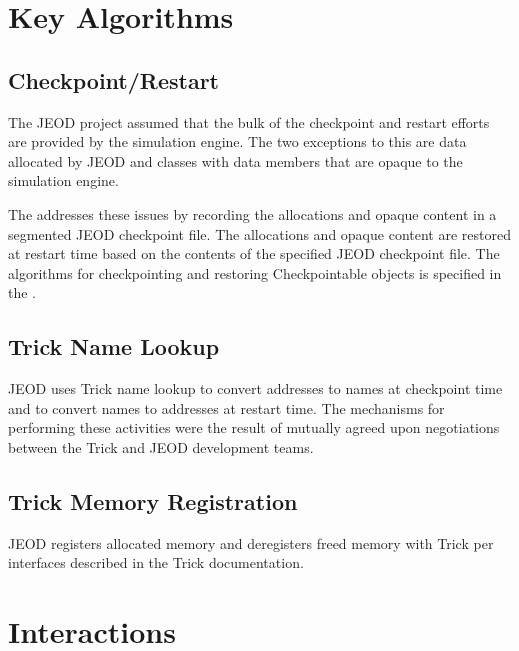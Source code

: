 \section{Key Algorithms}
\label{sec:algorithms}

\subsection{Checkpoint/Restart}
The JEOD project assumed that the bulk of the checkpoint and restart
efforts are provided by the simulation engine. The two exceptions to
this are data allocated by JEOD and classes with data members that
are opaque to the simulation engine.

The \ModelDesc addresses these issues by recording the allocations and
opaque content in a segmented JEOD checkpoint file. The allocations and opaque
content are restored at restart time based on the contents of the
specified JEOD checkpoint file.
The algorithms for checkpointing and restoring Checkpointable objects
is specified in the \CONTAINER.

\subsection{Trick Name Lookup}
JEOD uses Trick name lookup to convert addresses to names at checkpoint
time and to convert names to addresses at restart time. The mechanisms
for performing these activities were the result of mutually agreed upon
negotiations between the Trick and JEOD development teams.

\subsection{Trick Memory Registration}
JEOD registers allocated memory and deregisters freed memory with Trick
per interfaces described in the Trick documentation.


\section{Interactions}
\label{sec:interactions}

